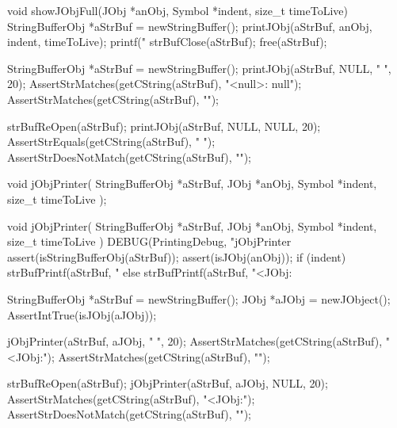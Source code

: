 void showJObjFull(JObj *anObj, Symbol *indent, size_t timeToLive) {
  StringBufferObj *aStrBuf = newStringBuffer();
  printJObj(aStrBuf, anObj, indent, timeToLive);
  printf("%
  strBufClose(aStrBuf);
  free(aStrBuf);
}
\stopCCode


\startCTest
  StringBufferObj *aStrBuf = newStringBuffer();
  printJObj(aStrBuf, NULL, "  ", 20);
  AssertStrMatches(getCString(aStrBuf), "<null>: null");
  AssertStrMatches(getCString(aStrBuf), "\n");
  
  strBufReOpen(aStrBuf);
  printJObj(aStrBuf, NULL, NULL, 20);
  AssertStrEquals(getCString(aStrBuf), " ");
  AssertStrDoesNotMatch(getCString(aStrBuf), "\n");
\stopCTest
\stopTestCase
\stopTestSuite

\startTestSuite[jObjPrinter]

\startCHeader
void jObjPrinter(
  StringBufferObj *aStrBuf,
  JObj            *anObj,
  Symbol          *indent,
  size_t          timeToLive
);
\stopCHeader

\startCCode
void jObjPrinter(
  StringBufferObj *aStrBuf,
  JObj            *anObj,
  Symbol          *indent,
  size_t           timeToLive
) {
  DEBUG(PrintingDebug, "jObjPrinter %
  assert(isStringBufferObj(aStrBuf));
  assert(isJObj(anObj));
  if (indent) {
    strBufPrintf(aStrBuf, "%
  } else {
    strBufPrintf(aStrBuf, "<JObj:%
  }
}
\stopCCode


\startCTest
  StringBufferObj *aStrBuf = newStringBuffer();
  JObj *aJObj = newJObject();
  AssertIntTrue(isJObj(aJObj));
  
  jObjPrinter(aStrBuf, aJObj, "  ", 20);
  AssertStrMatches(getCString(aStrBuf), "<JObj:");
  AssertStrMatches(getCString(aStrBuf), "\n");

  strBufReOpen(aStrBuf);
  jObjPrinter(aStrBuf, aJObj, NULL, 20);
  AssertStrMatches(getCString(aStrBuf), "<JObj:");
  AssertStrDoesNotMatch(getCString(aStrBuf), "\n");
\stopCTest
\stopTestCase
\stopTestSuite